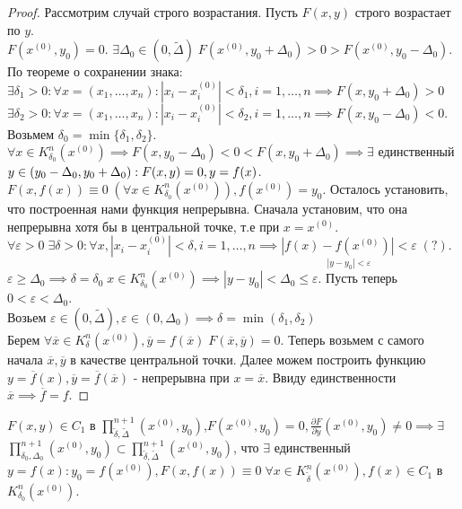 \documentclass[../main.tex]{subfiles}
\begin{document}
\begin{proof}
    Рассмотрим случай строго возрастания. Пусть $F(x,y)$ строго возрастает по $y$.\\ $F(x^{(0)},y_{0}) = 0$. $\exists \Delta_{0}\in  (0,\tilde{\Delta}) \; F(x^{(0)},y_{0}+\Delta_{0}) > 0 > F(x^{(0)},y_{0}-\Delta_{0})$. По теореме о сохранении знака:\\ $\exists \delta_{1}>0 : \forall x = (x_{1},\dots,x_{n}): |x_{i}-x_{i}^{(0)}|<\delta_{1} , i=1,\dots,n\implies F(x,y_{0}+\Delta_{0}) > 0$ 
    \\$\exists \delta_{2}>0 : \forall x = (x_{1},\dots,x_{n}) : |x_{i}-x_{i}^{(0)}| < \delta_{2},i=1,\dots,n\implies F(x,y_{0}-\Delta_{0}) < 0$. Возьмем $\delta_{0} = \min\{\delta_{1},\delta_{2}\}$. 
    \\$\forall x \in K_{\delta_{0}}^{n}(x^{(0)}) \implies F(x,y_{0}- \Delta_{0}) < 0 < F(x,y_{0}+\Delta_{0}) \implies \exists$ единственный $y \in (y_{0}-\Delta_{0},y_{0}+\Delta_{0}) :\\ F(x,y) = 0, y= f(x)$.
    \\$F(x,f(x))\equiv 0\;(\forall x \in K_{\delta_{0}}^{n}(x^{(0)})), f(x^{(0)}) = y_{0}$. Осталось установить, что построенная нами функция непрерывна. Сначала установим, что она непрерывна хотя бы в центральной точке, т.е при $x=x^{(0)}$.
    \\$\forall \varepsilon> 0 \; \exists \delta >0: \forall x, |x_{i} - x_{i}^{(0)}|<\delta , i=1,\dots,n \implies \underset{|y-y_{0}|<\varepsilon}{|f(x) - f(x^{(0)})| < \varepsilon} \; (?)$. 
    \\$\varepsilon \geqslant \Delta_{0} \implies \delta = \delta_{0}\; x \in K_{\delta_{0}}^{n}(x^{(0)}) \implies |y - y_{0}| < \Delta_{0} \leqslant \varepsilon$. Пусть теперь $0< \varepsilon < \Delta_{0}$. 
    \\Возьем $\varepsilon \in (0,\tilde{\Delta}), \varepsilon\in (0,\Delta_{0}) \implies \delta = \min{(\delta_{1}, \delta_{2})}$
    \\Берем $\forall \overline{x} \in K_{\delta}^{n}(x^{(0)}), \overline{y} = f(\overline{x}) \; F(\overline{x},\overline{y}) = 0$. Теперь возьмем с самого начала $\overline{x}, \overline{y}$ в качестве центральной точки. Далее можем построить функцию $y=\overline{f}(x),\overline{y} = \overline{f}(\overline{x})$ - непрерывна при $x= \overline{x}$. Ввиду единственности $\overline{x} \implies \overline{f} = f$.
\end{proof}

\begin{theorem}
    $F(x,y) \in C_{1}$ в $\textstyle \prod_{\tilde{\delta},\tilde{\Delta}}^{n+1}(x^{(0)},y_{0})$,$ F(x^{(0)},y_{0})= 0, \frac{\partial{F}}{\partial{y}}(x^{(0)},y_{0}) \neq 0 \implies \exists$$\textstyle \prod_{\delta_{0},\Delta_{0}}^{n+1}(x^{(0)},y_{0}) $$\subset$$\textstyle \prod_{\tilde{\delta},\tilde{\Delta}}^{n+1}(x^{(0)},y_{0})$, что $\exists$ единственный $y= f(x): y_{0} = f(x^{(0)}), F(x,f(x))\equiv 0 \; \forall x \in K_{\tilde{\delta}}^{n}(x^{(0)}), f(x) \in C_{1}$ в $K_{\delta_{0}}^{n}(x^{(0)})$.
\end{theorem}
\end{document}
